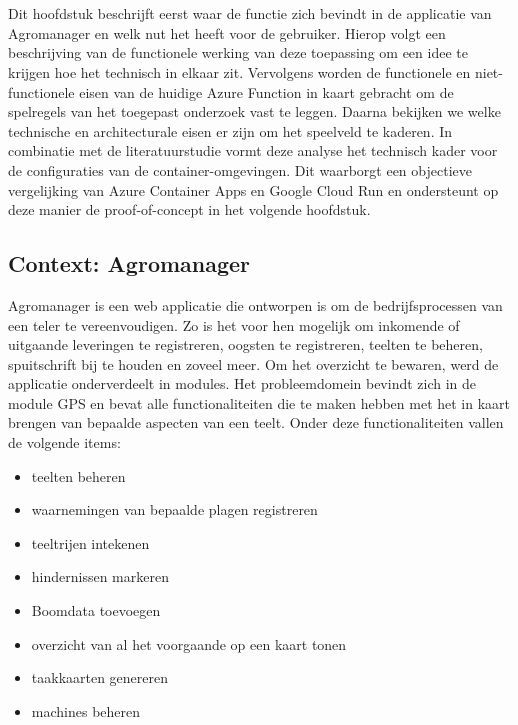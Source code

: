 \chapter{}%
\label{ch:requirements-analyse}

Dit hoofdstuk beschrijft eerst waar de functie zich bevindt in de applicatie van Agromanager en welk nut het heeft voor de gebruiker. Hierop volgt een beschrijving van de functionele werking van deze toepassing om een idee te krijgen hoe het technisch in elkaar zit. Vervolgens worden de functionele en niet-functionele eisen van de huidige Azure Function in kaart gebracht om de spelregels van het toegepast onderzoek vast te leggen. Daarna bekijken we welke technische en architecturale eisen er zijn om het speelveld te kaderen. In combinatie met de literatuurstudie vormt deze analyse het technisch kader voor de configuraties van de container-omgevingen. Dit waarborgt een objectieve vergelijking van Azure Container Apps en Google Cloud Run en ondersteunt op deze manier de proof-of-concept in het volgende hoofdstuk.

\section{Context: Agromanager}

Agromanager is een web applicatie die ontworpen is om de bedrijfsprocessen van een teler te vereenvoudigen. Zo is het voor hen mogelijk om inkomende of uitgaande leveringen te registreren, oogsten te registreren, teelten te beheren, spuitschrift bij te houden en zoveel meer. Om het overzicht te bewaren, werd de applicatie onderverdeelt in modules. Het probleemdomein bevindt zich in de module GPS en bevat alle functionaliteiten die te maken hebben met het in kaart brengen van bepaalde aspecten van een teelt. Onder deze functionaliteiten vallen de volgende items:

\begin{itemize}
    \item teelten beheren
    \item waarnemingen van bepaalde plagen registreren
    \item teeltrijen intekenen
    \item hindernissen markeren
    \item Boomdata toevoegen
    \item overzicht van al het voorgaande op een kaart tonen
    \item taakkaarten genereren
    \item machines beheren
\end{itemize}

